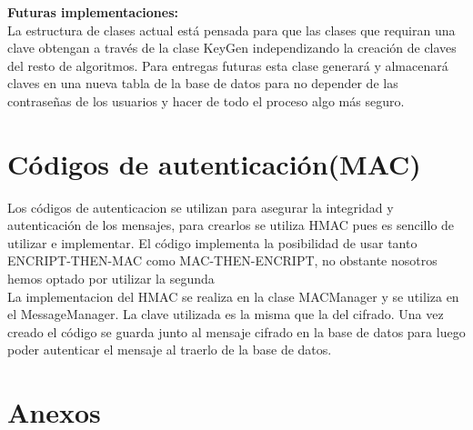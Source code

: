 \documentclass[a4paper,11pt]{article}
\begin{document}
\textbf{Futuras implementaciones:}\\ 
La estructura de clases actual está pensada para que las clases que requiran una clave obtengan a través de la clase KeyGen independizando la creación de claves del resto de algoritmos. Para entregas futuras esta clase generará y almacenará claves en una nueva tabla de la base de datos para no depender de las contraseñas de los usuarios y hacer de todo el proceso algo más seguro. 

\section{Códigos de autenticación(MAC)}
Los códigos de autenticacion se utilizan para asegurar la integridad y autenticación de los mensajes, para crearlos se utiliza HMAC pues es sencillo de utilizar e implementar. El código implementa la posibilidad de usar tanto ENCRIPT-THEN-MAC como MAC-THEN-ENCRIPT, no obstante nosotros hemos optado por utilizar la segunda\\ 
La implementacion del HMAC se realiza en la clase MACManager y se utiliza en el MessageManager. La clave utilizada es la misma que la del cifrado. Una vez creado el código se guarda junto al mensaje cifrado en la base de datos para luego poder autenticar el mensaje al traerlo de la base de datos. 



\newpage
\section{Anexos}
\centering
\end{document}
